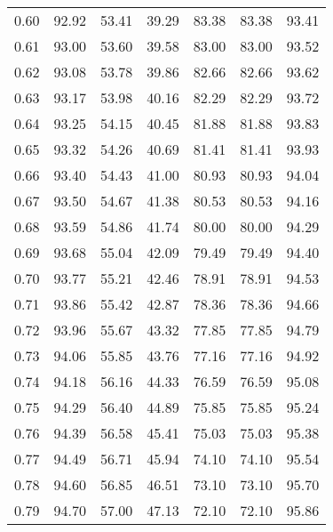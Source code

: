 \begin{tabular}{|c|c|c|c|c|c|c|}
      0.60 &     92.92 &     53.41 &      39.29 &   83.38 &      83.38 &         93.41 \\
      0.61 &     93.00 &     53.60 &      39.58 &   83.00 &      83.00 &         93.52 \\
      0.62 &     93.08 &     53.78 &      39.86 &   82.66 &      82.66 &         93.62 \\
      0.63 &     93.17 &     53.98 &      40.16 &   82.29 &      82.29 &         93.72 \\
      0.64 &     93.25 &     54.15 &      40.45 &   81.88 &      81.88 &         93.83 \\
      0.65 &     93.32 &     54.26 &      40.69 &   81.41 &      81.41 &         93.93 \\
      0.66 &     93.40 &     54.43 &      41.00 &   80.93 &      80.93 &         94.04 \\
      0.67 &     93.50 &     54.67 &      41.38 &   80.53 &      80.53 &         94.16 \\
      0.68 &     93.59 &     54.86 &      41.74 &   80.00 &      80.00 &         94.29 \\
      0.69 &     93.68 &     55.04 &      42.09 &   79.49 &      79.49 &         94.40 \\
      0.70 &     93.77 &     55.21 &      42.46 &   78.91 &      78.91 &         94.53 \\
      0.71 &     93.86 &     55.42 &      42.87 &   78.36 &      78.36 &         94.66 \\
      0.72 &     93.96 &     55.67 &      43.32 &   77.85 &      77.85 &         94.79 \\
      0.73 &     94.06 &     55.85 &      43.76 &   77.16 &      77.16 &         94.92 \\
      0.74 &     94.18 &     56.16 &      44.33 &   76.59 &      76.59 &         95.08 \\
      0.75 &     94.29 &     56.40 &      44.89 &   75.85 &      75.85 &         95.24 \\
      0.76 &     94.39 &     56.58 &      45.41 &   75.03 &      75.03 &         95.38 \\
      0.77 &     94.49 &     56.71 &      45.94 &   74.10 &      74.10 &         95.54 \\
      0.78 &     94.60 &     56.85 &      46.51 &   73.10 &      73.10 &         95.70 \\
      0.79 &     94.70 &     57.00 &      47.13 &   72.10 &      72.10 &         95.86 \\

\end{tabular}

